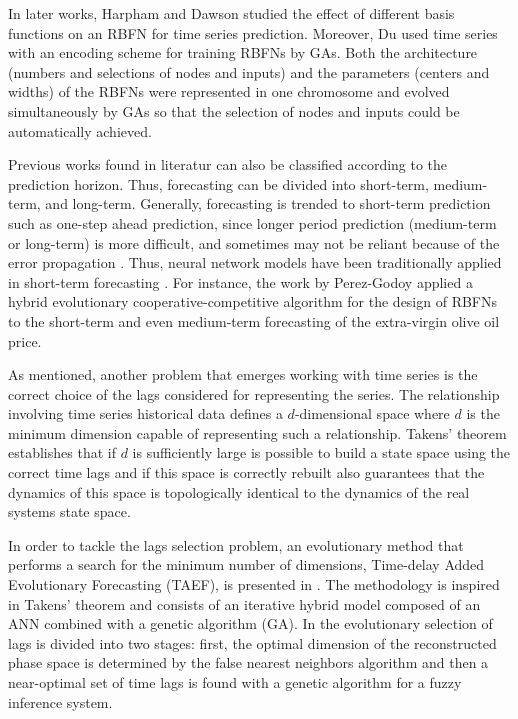\documentclass[preprint,authoryear,12pt]{elsarticle}
\begin{document}
In later works, Harpham and Dawson \cite{Harpham06} studied the effect of different basis functions on an RBFN for time series prediction. Moreover, Du \cite{Du2008} used time series with an encoding scheme for training RBFNs by GAs. Both the architecture (numbers and selections of nodes and inputs) and the parameters (centers and widths) of the RBFNs were represented in one chromosome and evolved simultaneously by GAs so that the selection of nodes and inputs could be automatically achieved.

Previous works found in literatur can also be classified according to the prediction horizon. Thus, forecasting can be divided into short-term, medium-term, and long-term. Generally, forecasting is trended to short-term prediction such as one-step ahead prediction, since longer period prediction (medium-term or long-term) is more difficult, and sometimes may not be reliant because of the error propagation \cite{Chatterjee06}. Thus, neural network models have been traditionally applied in short-term forecasting \cite{Hippert10,Lee09}. For instance, the work by Perez-Godoy \cite{PerezGodoy2010} applied a hybrid evolutionary cooperative-competitive algorithm for the design of RBFNs to the short-term and even medium-term forecasting of the extra-virgin olive oil price.


As mentioned, another problem that emerges working with time series is the correct choice of the lags considered for representing the series. The relationship involving time series historical data defines a $d$-dimensional space where $d$ is the minimum dimension capable of representing such a relationship. Takens' theorem \cite{Takens1980} establishes that if $d$ is sufficiently large is possible to build a state space using the correct time lags and if this space is correctly rebuilt also guarantees that the dynamics of this space is topologically identical to the dynamics of the real systems state space. %

In order to tackle the lags selection problem, an evolutionary method that performs a search for the minimum number of dimensions, Time-delay Added Evolutionary Forecasting (TAEF), is presented in \cite{Ferreira2008}. The methodology is inspired in Takens' theorem and consists of an iterative hybrid model composed of an ANN combined with a genetic algorithm (GA). In \cite{Luko2010} the evolutionary selection of lags is divided into two stages: first, the optimal dimension of the reconstructed phase space is determined by the false nearest neighbors algorithm and then a near-optimal set of time lags is found with a genetic algorithm for a fuzzy inference system.
\end{document}
